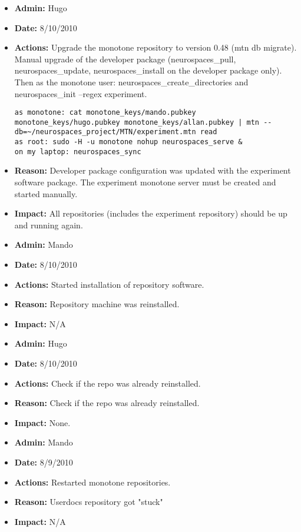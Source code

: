 \documentclass[12pt]{article}
\begin{document}
\begin{itemize}
\item[] {\bf Admin:} Hugo
\item[] {\bf Date:} 8/10/2010 
\item[] {\bf Actions:} Upgrade the monotone repository to version 0.48
  (mtn db migrate). Manual upgrade of the developer package
  (neurospaces\_pull, neurospaces\_update, neurospaces\_install on the
  developer package only).  Then as the monotone user:
  neurospaces\_create\_directories and neurospaces\_init --regex
  experiment.
\begin{verbatim}
as monotone: cat monotone_keys/mando.pubkey monotone_keys/hugo.pubkey monotone_keys/allan.pubkey | mtn --db=~/neurospaces_project/MTN/experiment.mtn read
as root: sudo -H -u monotone nohup neurospaces_serve &
on my laptop: neurospaces_sync
\end{verbatim}
\item[] {\bf Reason:} Developer package configuration was updated with
  the experiment software package.  The experiment monotone server
  must be created and started manually.
\item[] {\bf Impact:} All repositories (includes the experiment
  repository) should be up and running again.
\end{itemize}

\begin{itemize}
\item[] {\bf Admin:} Mando
\item[] {\bf Date:} 8/10/2010 
\item[] {\bf Actions:} Started installation of repository software.
\item[] {\bf Reason:} Repository machine was reinstalled.
\item[] {\bf Impact:} N/A
\end{itemize}


\begin{itemize}
\item[] {\bf Admin:} Hugo
\item[] {\bf Date:} 8/10/2010 
\item[] {\bf Actions:} Check if the repo was already reinstalled.
\item[] {\bf Reason:} Check if the repo was already reinstalled.
\item[] {\bf Impact:} None.
\end{itemize}

\begin{itemize}
\item[] {\bf Admin:} Mando
\item[] {\bf Date:} 8/9/2010 
\item[] {\bf Actions:} Restarted monotone repositories.
\item[] {\bf Reason:} Userdocs repository got "stuck"
\item[] {\bf Impact:} N/A
\end{itemize}
\end{document}
